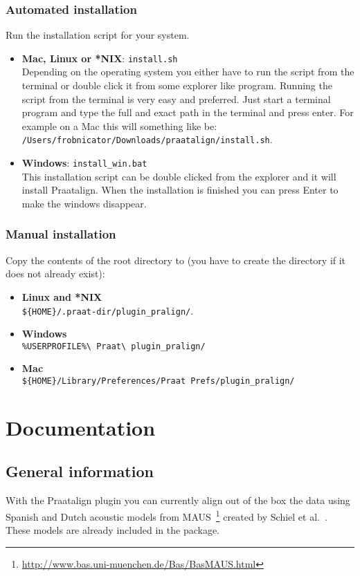\subsection{Automated installation}
Run the installation script for your system.
\begin{itemize}
	\item \textbf{Mac, Linux or *NIX}: \texttt{install.sh}\\
		Depending on the operating system you either have to run the script from
		the terminal or double click it from some explorer like program. Running
		the script from the terminal is very easy and preferred. Just start a
		terminal program and type the full and exact path in the terminal and press
		enter. For example on a Mac this will something like be:\\
		\texttt{/Users/frobnicator/Downloads/praatalign/install.sh}.
	\item \textbf{Windows}: \texttt{install\_win.bat}\\
		This installation script can be double clicked from the explorer and it
		will install Praatalign. When the installation is finished you can press
		Enter to make the windows disappear.
\end{itemize}

\subsection{Manual installation}
Copy the contents of the root directory to (you have to create the directory if
it does not already exist):
\begin{itemize}
	\item \textbf{Linux and *NIX}\\
		\texttt{\$\{HOME\}/.praat-dir/plugin\_pralign/}.
	\item \textbf{Windows}\\
		\texttt{\%USERPROFILE\%\textbackslash{} Praat\textbackslash{} plugin\_pralign/}
	\item \textbf{Mac}\\
		\texttt{\$\{HOME\}/Library/Preferences/Praat Prefs/plugin\_pralign/}
\end{itemize}

\chapter{Documentation}
\section{General information}
With the Praatalign plugin you can currently align out of the box the data
using Spanish and Dutch acoustic models from
MAUS~\footnote{\url{http://www.bas.uni-muenchen.de/Bas/BasMAUS.html}} created
by Schiel et al.~\cite{schiel:999}. These models are already included in the
package. %


